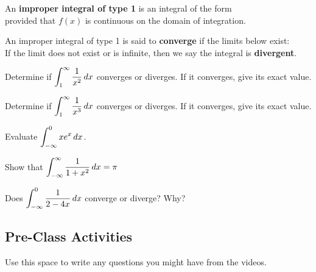 \documentclass[notes]{subfiles}
\begin{document}
		\begin{defn}
			An \textbf{improper integral of type 1} is an integral of the form \\[70pt]
			provided that $f(x)$ is continuous on the domain of integration.
			
		\end{defn}	
		
		\begin{defn}
			An improper integral of type 1 is said to \textbf{converge} if the limits below exist:\\[70pt]
			
			If the limit does not exist or is infinite, then we say the integral is \textbf{divergent}.
		\end{defn}
		
		\begin{ex}
			Determine if $\displaystyle \int_1^\infty \dfrac{1}{x^2}\, dx$ converges or diverges.  If it converges, give its exact value.
		\end{ex}
			
		\begin{ex}
			Determine if $\displaystyle \int_1^\infty \dfrac{1}{x^3}\, dx$ converges or diverges.  If it converges, give its exact value.
		\end{ex}
			\newpage
			
		\begin{ex}
			Evaluate $\displaystyle \int_{-\infty}^0 xe^x\, dx$.
		\end{ex}
			
		\begin{ex}
			Show that $\displaystyle \int_{-\infty}^{\infty} \dfrac{1}{1+x^2}\, dx = \pi$
		\end{ex}
			
		\begin{ex}
			Does $\displaystyle \int_{-\infty}^0 \dfrac{1}{2-4x}\, dx$ converge or diverge?  Why?
		\end{ex}
			\newpage
			
		\newpage
	\subsection*{Pre-Class Activities}
		\begin{ex}
			Use this space to write any questions you might have from the videos.
		\end{ex}
			
\end{document}
